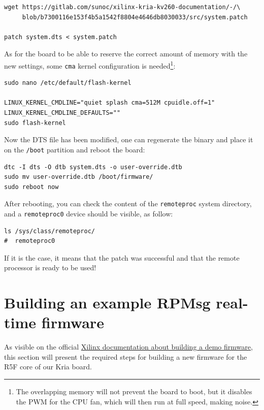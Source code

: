 \documentclass[10pt]{article}
\begin{document}
\begin{verbatim}
wget https://gitlab.com/sunoc/xilinx-kria-kv260-documentation/-/\
     blob/b7300116e153f4b5a1542f8804e4646db8030033/src/system.patch

patch system.dts < system.patch
\end{verbatim}

As for the board to be able to reserve the correct amount of memory with the new settings, some
\texttt{cma} kernel configuration is needed\footnote{The overlapping memory will not prevent the board to boot,
but it disables the PWM for the CPU fan, which will then run at full speed, making noise.}:

\begin{verbatim}
sudo nano /etc/default/flash-kernel

LINUX_KERNEL_CMDLINE="quiet splash cma=512M cpuidle.off=1"
LINUX_KERNEL_CMDLINE_DEFAULTS=""
sudo flash-kernel
\end{verbatim}

Now the DTS file has been modified, one can regenerate the binary and place it on the \texttt{/boot} partition
and reboot the board:

\begin{verbatim}
dtc -I dts -O dtb system.dts -o user-override.dtb
sudo mv user-override.dtb /boot/firmware/
sudo reboot now
\end{verbatim}

After rebooting, you can check the content of the \verb|remoteproc| system directory,
and a \texttt{remoteproc0} device should be visible, as follow:

\begin{verbatim}
ls /sys/class/remoteproc/
#  remoteproc0
\end{verbatim}

If it is the case, it means that the patch was successful and  that the remote processor is
ready to be used!
\pagebreak

\section{Building an example RPMsg real-time firmware}
\label{sec:org59487c5}
As visible on the official \href{https://xilinx-wiki.atlassian.net/wiki/spaces/A/pages/1837006921/OpenAMP+Base+Hardware+Configurations\\\#Build-RPU-firmware}{Xilinx documentation about building a demo firmware},
this section will present the required steps for building a new firmware for the R5F
core of our Kria board.
\end{document}
